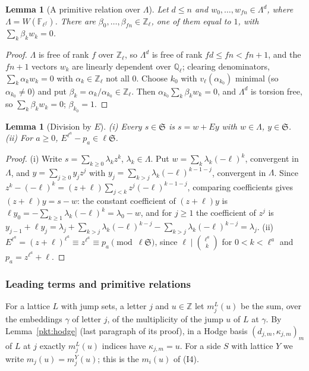 \documentclass[10pt]{amsart}
\newtheorem{lemma}[theorem]{Lemma}
\theoremstyle{definition}
\theoremstyle{remark}
\newcommand{\Z}{\mathbb Z}
\newcommand{\Q}{\mathbb Q}
\begin{document}
\begin{lemma}[A primitive relation over $\Lambda$]\label{pkh:wrel}
Let $d\le n$ and $w_0,\dots,w_{fn}\in\Lambda^d$, where $\Lambda=W(\mathbb F_{\ell^f})$. There are
$\beta_0,\dots,\beta_{fn}\in\Z_\ell$, one of them equal to $1$, with $\sum_k\beta_kw_k=0$.
\end{lemma}

\begin{proof}
$\Lambda$ is free of rank $f$ over $\Z_\ell$, so $\Lambda^d$ is free of rank $fd\le fn<fn+1$, and the $fn+1$
vectors $w_k$ are linearly dependent over $\Q_\ell$; clearing denominators, $\sum_k\alpha_kw_k=0$ with
$\alpha_k\in\Z_\ell$ not all $0$. Choose $k_0$ with $v_\ell(\alpha_{k_0})$ minimal (so $\alpha_{k_0}\ne0$) and put
$\beta_k=\alpha_k/\alpha_{k_0}\in\Z_\ell$. Then $\alpha_{k_0}\sum_k\beta_kw_k=0$, and $\Lambda^d$ is torsion free, so
$\sum_k\beta_kw_k=0$; $\beta_{k_0}=1$.
\end{proof}

\begin{lemma}[Division by $E$]\label{pkh:Ediv}
(i) Every $s\in\mathfrak S$ is $s=w+Ey$ with $w\in\Lambda$, $y\in\mathfrak S$. (ii) For $a\ge0$,
$E^{\ell^a}-p_a\in\ell\mathfrak S$.
\end{lemma}

\begin{proof}
(i) Write $s=\sum_{k\ge0}\lambda_kz^k$, $\lambda_k\in\Lambda$. Put $w=\sum_k\lambda_k(-\ell)^k$, convergent in
$\Lambda$, and $y=\sum_{j\ge0}y_jz^j$ with $y_j=\sum_{k>j}\lambda_k(-\ell)^{k-1-j}$, convergent in $\Lambda$. Since
$z^k-(-\ell)^k=(z+\ell)\sum_{j<k}z^j(-\ell)^{k-1-j}$, comparing coefficients gives $(z+\ell)y=s-w$: the constant
coefficient of $(z+\ell)y$ is $\ell y_0=-\sum_{k\ge1}\lambda_k(-\ell)^k=\lambda_0-w$, and for $j\ge1$ the coefficient
of $z^j$ is $y_{j-1}+\ell y_j=\lambda_j+\sum_{k>j}\lambda_k(-\ell)^{k-j}-\sum_{k>j}\lambda_k(-\ell)^{k-j}=\lambda_j$.
(ii) $E^{\ell^a}=(z+\ell)^{\ell^a}
\equiv z^{\ell^a}\equiv p_a\pmod{\ell\mathfrak S}$, since $\ell\mid\binom{\ell^a}{k}$ for $0<k<\ell^a$ and
$p_a=z^{\ell^a}+\ell$.
\end{proof}

\subsubsection{Leading terms and primitive relations}\label{pkh:ss-lead}

For a lattice $L$ with jump sets, a letter $j$ and $u\in\Z$ let $m^L_j(u)$ be the sum, over the
embeddings $\gamma$ of letter $j$, of the multiplicity of the jump $u$ of $L$ at $\gamma$. By
Lemma~\ref{pkt:hodge} (last paragraph of its proof), in a Hodge basis $(d_{j,m},\kappa_{j,m})_m$ of $L$ at $j$
exactly $m^L_j(u)$ indices have $\kappa_{j,m}=u$. For a side $S$ with lattice $Y$ we write $m_j(u)=m^Y_j(u)$;
this is the $m_i(u)$ of (I4).
\end{document}
